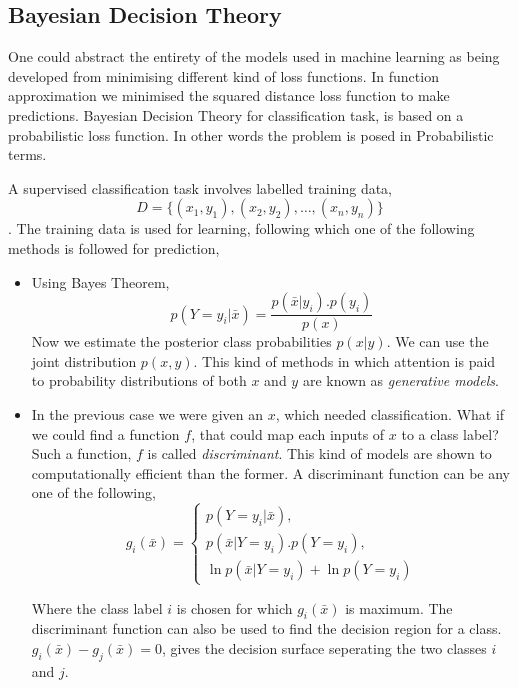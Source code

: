  \subsection*{Bayesian Decision Theory}
 
 One could abstract the entirety of the models used in machine learning as being developed from minimising different kind of loss functions. In function approximation we minimised the squared distance loss function to make predictions. Bayesian Decision Theory for classification task, is based on a probabilistic loss function. In other words the problem is posed in Probabilistic terms.  \par
 A supervised classification task involves labelled training data,
 \[D = \{(x_1,y_1),(x_2,y_2),\dots, (x_n,y_n)\}\]. The training data is used for learning, following which one of the following methods is followed for prediction,
 
 \begin{itemize}
     \item Using Bayes Theorem,
                   \[  p(Y = y_i|\bar{x}) = \frac{p(\bar{x}|y_i).p(y_i)}{p(x)}  \]
            Now we estimate the posterior class probabilities $p(x|y)$. We can use the joint distribution $p(x,y)$. This kind of methods in which attention is paid to probability distributions of both $x$ and $y$ are known as \textit{generative models}.
     \item In the previous case we were given an $x$, which needed classification. What if we could find a function $f$, that could map each inputs of $x$ to a class label? Such a function, $f$ is called \textit{discriminant}. This kind of models are shown to computationally efficient than the former. A discriminant function can be any one of the following,
     \[
         g_i(\bar{x}) = \begin{cases}  
         
                   p(Y=y_i|\bar{x}), \\
                   
                  p(\bar{x}|Y=y_i).p(Y=y_i), \\
                  
                  \ln{p(\bar{x}|Y=y_i)} + \ln{p(Y=y_i)}
                  
         \end{cases}
     \]
     
     Where the class label $i$ is chosen for which $g_i(\bar{x})$ is maximum. The discriminant function can also be used to find the decision region for a class. $g_i(\bar{x}) - g_j(\bar{x}) = 0 $, gives the decision surface seperating the two classes $i$ and $j$.
     
 
 \end{itemize}
 
